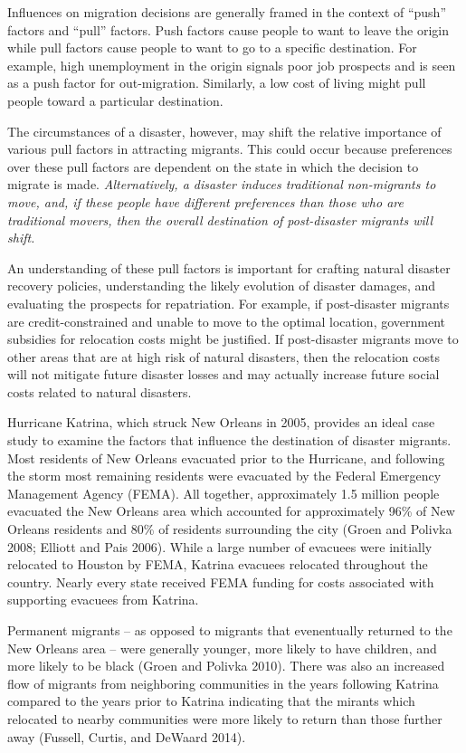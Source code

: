 \documentclass[]{article}
\begin{document}
Influences on migration decisions are generally framed in the context of
``push'' factors and ``pull'' factors. Push factors cause people to want
to leave the origin while pull factors cause people to want to go to a
specific destination. For example, high unemployment in the origin
signals poor job prospects and is seen as a push factor for
out-migration. Similarly, a low cost of living might pull people toward
a particular destination.

The circumstances of a disaster, however, may shift the relative
importance of various pull factors in attracting migrants. This could
occur because preferences over these pull factors are dependent on the
state in which the decision to migrate is made. \emph{Alternatively, a
disaster induces traditional non-migrants to move, and, if these people
have different preferences than those who are traditional movers, then
the overall destination of post-disaster migrants will shift.}

An understanding of these pull factors is important for crafting natural
disaster recovery policies, understanding the likely evolution of
disaster damages, and evaluating the prospects for repatriation. For
example, if post-disaster migrants are credit-constrained and unable to
move to the optimal location, government subsidies for relocation costs
might be justified. If post-disaster migrants move to other areas that
are at high risk of natural disasters, then the relocation costs will
not mitigate future disaster losses and may actually increase future
social costs related to natural disasters.

Hurricane Katrina, which struck New Orleans in 2005, provides an ideal
case study to examine the factors that influence the destination of
disaster migrants. Most residents of New Orleans evacuated prior to the
Hurricane, and following the storm most remaining residents were
evacuated by the Federal Emergency Management Agency (FEMA). All
together, approximately 1.5 million people evacuated the New Orleans
area which accounted for approximately 96\% of New Orleans residents and
80\% of residents surrounding the city (Groen and Polivka 2008; Elliott
and Pais 2006). While a large number of evacuees were initially
relocated to Houston by FEMA, Katrina evacuees relocated throughout the
country. Nearly every state received FEMA funding for costs associated
with supporting evacuees from Katrina.

Permanent migrants -- as opposed to migrants that evenentually returned
to the New Orleans area -- were generally younger, more likely to have
children, and more likely to be black (Groen and Polivka 2010). There
was also an increased flow of migrants from neighboring communities in
the years following Katrina compared to the years prior to Katrina
indicating that the mirants which relocated to nearby communities were
more likely to return than those further away (Fussell, Curtis, and
DeWaard 2014).
\end{document}
